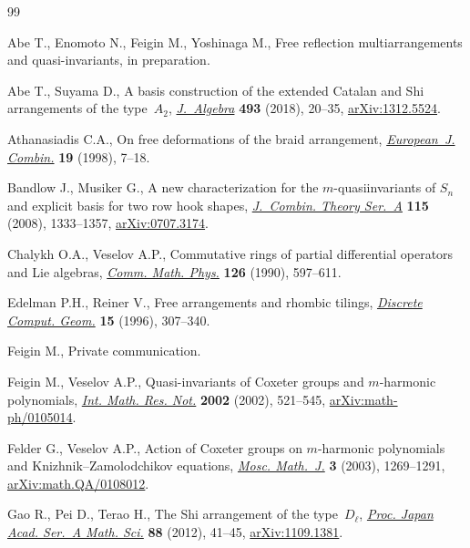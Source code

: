 \begin{thebibliography}{99}
\footnotesize\itemsep=0pt

Abe T., Enomoto N., Feigin M., Yoshinaga M., Free reflection multiarrangements
 and quasi-invariants, {i}n preparation.

Abe T., Suyama D., A basis construction of the extended {C}atalan and {S}hi
 arrangements of the type~{$A_2$}, \href{https://doi.org/10.1016/j.jalgebra.2017.09.024}{\textit{J.~Algebra}} \textbf{493} (2018),
 20--35, \href{https://arxiv.org/abs/1312.5524}{arXiv:1312.5524}.

Athanasiadis C.A., On free deformations of the braid arrangement,
 \href{https://doi.org/10.1006/eujc.1997.0149}{\textit{European~J. Combin.}} \textbf{19} (1998), 7--18.

Bandlow J., Musiker G., A new characterization for the {$m$}-quasiinvariants of
 {$S_n$} and explicit basis for two row hook shapes, \href{https://doi.org/10.1016/j.jcta.2008.01.011}{\textit{J.~Combin. Theory
 Ser.~A}} \textbf{115} (2008), 1333--1357, \href{https://arxiv.org/abs/0707.3174}{arXiv:0707.3174}.

Chalykh O.A., Veselov A.P., Commutative rings of partial differential operators
 and {L}ie algebras, \href{https://doi.org/10.1007/BF02125702}{\textit{Comm. Math. Phys.}} \textbf{126} (1990), 597--611.

Edelman P.H., Reiner V., Free arrangements and rhombic tilings,
 \href{https://doi.org/10.1007/BF02711498}{\textit{Discrete Comput. Geom.}} \textbf{15} (1996), 307--340.

Feigin M., Private communication.

Feigin M., Veselov A.P., Quasi-invariants of {C}oxeter groups and
 {$m$}-harmonic polynomials, \href{https://doi.org/10.1155/S1073792802106064}{\textit{Int. Math. Res. Not.}} \textbf{2002}
 (2002), 521--545, \href{https://arxiv.org/abs/math-ph/0105014}{arXiv:math-ph/0105014}.

Felder G., Veselov A.P., Action of {C}oxeter groups on {$m$}-harmonic
 polynomials and {K}nizhnik--{Z}amolodchikov equations, \href{https://doi.org/10.17323/1609-4514-2003-3-4-1269-1291}{\textit{Mosc.
 Math.~J.}} \textbf{3} (2003), 1269--1291, \href{https://arxiv.org/abs/math.QA/0108012}{arXiv:math.QA/0108012}.

Gao R., Pei D., Terao H., The {S}hi arrangement of the type~{$D_\ell$},
 \href{https://doi.org/10.3792/pjaa.88.41}{\textit{Proc. Japan Acad. Ser.~A Math. Sci.}} \textbf{88} (2012), 41--45,
 \href{https://arxiv.org/abs/1109.1381}{arXiv:1109.1381}.


\end{thebibliography}
